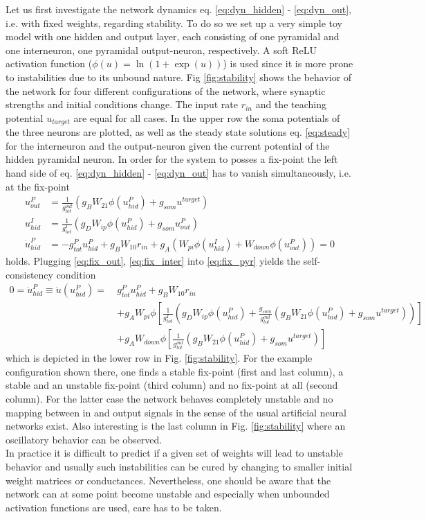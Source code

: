 \documentclass[12pt,a4paper]{article}
\begin{document}
Let us first investigate the network dynamics eq. \eqref{eq:dyn_hidden} - \eqref{eq:dyn_out}, i.e. with fixed weights, regarding stability. To do so we set up a very simple toy model with one hidden and output layer, each consisting of one pyramidal and one interneuron, one pyramidal output-neuron, respectively. A soft ReLU activation function ($\phi(u) = \ln(1 + \exp(u))$) is used since it is more prone to instabilities due to its unbound nature. Fig \ref{fig:stability} shows the behavior of the network for four different configurations of the network, where synaptic strengths and initial conditions change. The input rate $r_{in}$ and the teaching potential $u_{target}$ are equal for all cases. In the upper row the soma potentials of the three neurons are plotted, as well as the steady state solutions eq. \eqref{eq:steady} for the interneuron and the output-neuron given the current potential of the hidden pyramidal neuron.
In order for the system to posses a fix-point the left hand side of eq. \eqref{eq:dyn_hidden} - \eqref{eq:dyn_out} has to vanish simultaneously, i.e. at the fix-point
\begin{align}
u^{P}_{out} &= \frac{1}{g^{out}_{tot}}\left( g_B W_{21}\phi(u^P_{hid}) + g_{som}u^{target}\right) \label{eq:fix_out}\\
u^{I}_{hid} &= \frac{1}{g^{I}_{tot}}\left( g_D W_{ip}\phi(u^P_{hid}) + g_{som}u^{P}_{out}\right) \label{eq:fix_inter}\\
\dot{u}^P_{hid} &= -g^{P}_{tot}u^P_{hid} + g_B W_{10}r_{in} + g_A\left(W_{pi}\phi(u^I_{hid}) + W_{down}\phi(u^P_{out})\right) = 0 \label{eq:fix_pyr}
\end{align}
holds. Plugging \eqref{eq:fix_out}, \eqref{eq:fix_inter} into \eqref{eq:fix_pyr} yields the self-consistency condition
\begin{align}
0 = \dot{u}^P_{hid} \equiv \dot{u}(u^P_{hid}) = ~&g^P_{tot}u^P_{hid} + g_B W_{10}r_{in} \nonumber\\
&+ g_AW_{pi}\phi\left[\frac{1}{g^I_{tot}}\left( g_D W_{ip}\phi(u^P_{hid}) + \frac{g_{som}}{g^{out}_{tot}}\left( g_B W_{21}\phi(u^P_{hid}) + g_{som}u^{target}\right)\right)\right] \nonumber\\
&+ g_AW_{down}\phi\left[\frac{1}{g^{out}_{tot}}\left( g_B W_{21}\phi(u^P_{hid}) + g_{som}u^{target}\right)\right]
\end{align}
which is depicted in the lower row in Fig. \ref{fig:stability}. For the example configuration shown there, one finds a stable fix-point (first and last column), a stable and an unstable fix-point (third column) and no fix-point at all (second column). For the latter case the network behaves completely unstable and no mapping between in and output signals in the sense of the usual artificial neural networks exist. Also interesting is the last column in Fig. \ref{fig:stability} where an oscillatory behavior can be observed.\\
In practice it is difficult to predict if a given set of weights will lead to unstable behavior and usually such instabilities can be cured by changing to smaller initial weight matrices or conductances. Nevertheless, one should be aware that the network can at some point become unstable and especially when unbounded activation functions are used, care has to be taken.
\end{document}
